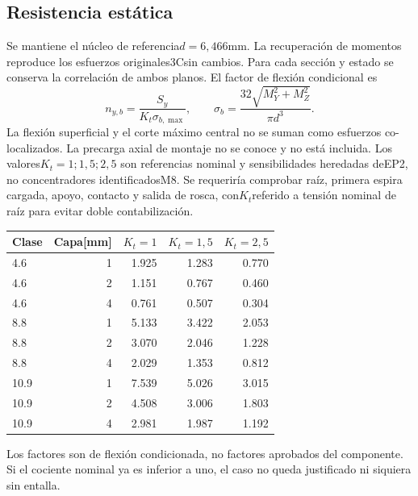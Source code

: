 \subsection{Resistencia estática}
Se mantiene el núcleo de referencia$d=6,466$mm. La recuperación de momentos reproduce
los esfuerzos originales3Csin cambios. Para cada sección y estado se conserva la correlación
de ambos planos. El factor de flexión condicional es
\[
n_{y,b}=\frac{S_y}{K_t\sigma_{b,\max}},\qquad
\sigma_b=\frac{32\sqrt{M_Y^2+M_Z^2}}{\pi d^3}.
\]
La flexión superficial y el corte máximo central no se suman como esfuerzos co-localizados.
La precarga axial de montaje no se conoce y no está incluida. Los valores$K_t=1;1,5;2,5$
son referencias nominal y sensibilidades heredadas deEP2, no concentradores identificadosM8.
Se requeriría comprobar raíz, primera espira cargada, apoyo, contacto y salida de rosca,
con$K_t$referido a tensión nominal de raíz para evitar doble contabilización.

\begin{center}\begin{tabular}{lrrrr}\toprule
Clase&Capa[mm]&$K_t=1$&$K_t=1,5$&$K_t=2,5$\\\midrule
4.6 & 1 & 1.925 & 1.283 & 0.770\\
4.6 & 2 & 1.151 & 0.767 & 0.460\\
4.6 & 4 & 0.761 & 0.507 & 0.304\\
8.8 & 1 & 5.133 & 3.422 & 2.053\\
8.8 & 2 & 3.070 & 2.046 & 1.228\\
8.8 & 4 & 2.029 & 1.353 & 0.812\\
10.9 & 1 & 7.539 & 5.026 & 3.015\\
10.9 & 2 & 4.508 & 3.006 & 1.803\\
10.9 & 4 & 2.981 & 1.987 & 1.192\\
\bottomrule\end{tabular}\end{center}
Los factores son de flexión condicionada, no factores aprobados del componente.
Si el cociente nominal ya es inferior a uno, el caso no queda justificado ni siquiera sin entalla.


